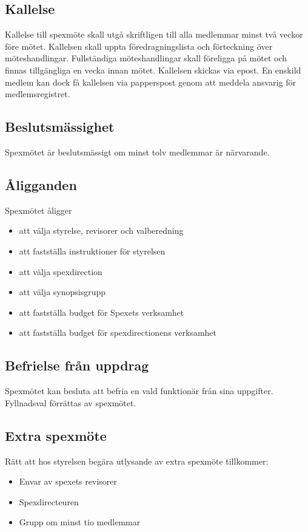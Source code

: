 \documentclass[a4paper]{article}
\begin{document}
\subsection{Kallelse}
Kallelse till spexmöte skall utgå skriftligen till alla medlemmar minst två veckor före mötet. Kallelsen skall uppta föredragningslista och förteckning över möteshandlingar. Fullständiga möteshandlingar skall föreligga på mötet och finnas tillgängliga en vecka innan mötet.\newline
\newline
Kallelsen skickas via epost. En enskild medlem kan dock få kallelsen via papperspost genom att meddela ansvarig för medlemsregistret.

\subsection{Beslutsmässighet}
Spexmötet är beslutsmässigt om minst tolv medlemmar är närvarande.

\subsection{Åligganden}
Spexmötet åligger

\begin{itemize}
  \item att välja styrelse, revisorer och valberedning
  \item att fastställa instruktioner för styrelsen
  \item att välja spexdirection
  \item att välja synopsisgrupp
  \item att fastställa budget för Spexets verksamhet
  \item att fastställa budget för spexdirectionens verksamhet
\end{itemize}

\subsection{Befrielse från uppdrag}
Spexmötet kan besluta att befria en vald funktionär från sina uppgifter. Fyllnadsval förrättas av spexmötet.

\subsection{Extra spexmöte}
Rätt att hos styrelsen begära utlysande av extra spexmöte tillkommer:

\begin{itemize}
  \item Envar av spexets revisorer
  \item Spexdirecteuren
  \item Grupp om minst tio medlemmar
\end{itemize}
\end{document}
